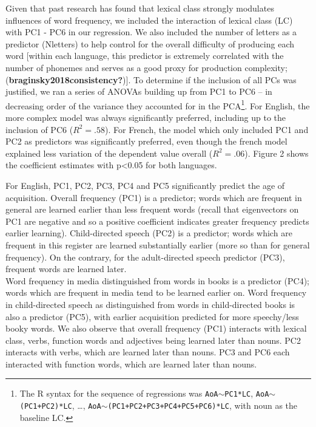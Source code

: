 \documentclass[10pt, letterpaper]{article}
\begin{document}
Given that past research has found that lexical class strongly modulates
influences of word frequency, we included the interaction of lexical
class (LC) with PC1 - PC6 in our regression. We also included the number
of letters as a predictor (Nletters) to help control for the overall
difficulty of producing each word {[}within each language, this
predictor is extremely correlated with the number of phonemes and serves
as a good proxy for production complexity;
(\textbf{braginsky2018consistency?}){]}. To determine if the inclusion
of all PCs was justified, we ran a series of ANOVAs building up from PC1
to PC6 -- in decreasing order of the variance they accounted for in the
PCA\footnote{The R syntax for the sequence of regressions was
  \texttt{AoA}\(\sim\)\texttt{PC1*LC},
  \texttt{AoA}\(\sim\)\texttt{(PC1+PC2)*LC}, \ldots,
  \texttt{AoA}\(\sim\)\texttt{(PC1+PC2+PC3+PC4+PC5+PC6)*LC}, with noun
  as the baseline LC.}. For English, the more complex model was always
significantly preferred, including up to the inclusion of PC6
(\(R^2 = .58\)). For French, the model which only included PC1 and PC2
as predictors was significantly preferred, even though the french model
explained less variation of the dependent value overall (\(R^2 = .06\)).
Figure 2 shows the coefficient estimates with p\textless0.05 for both
languages.

For English, PC1, PC2, PC3, PC4 and PC5 significantly predict the age of
acquisition. Overall frequency (PC1) is a predictor; words which are
frequent in general are learned earlier than less frequent words (recall
that eigenvectors on PC1 are negative and so a positive coefficient
indicates greater frequency predicts earlier learning). Child-directed
speech (PC2) is a predictor; words which are frequent in this register
are learned substantially earlier (more so than for general frequency).
On the contrary, for the adult-directed speech predictor (PC3), frequent
words are learned later.\\
Word frequency in media distinguished from words in books is a predictor
(PC4); words which are frequent in media tend to be learned earlier on.
Word frequency in child-directed speech as distinguished from words in
child-directed books is also a predictor (PC5), with earlier acquisition
predicted for more speechy/less booky words. We also observe that
overall frequency (PC1) interacts with lexical class, verbs, function
words and adjectives being learned later than nouns. PC2 interacts with
verbs, which are learned later than nouns. PC3 and PC6 each interacted
with function words, which are learned later than nouns.
\end{document}
